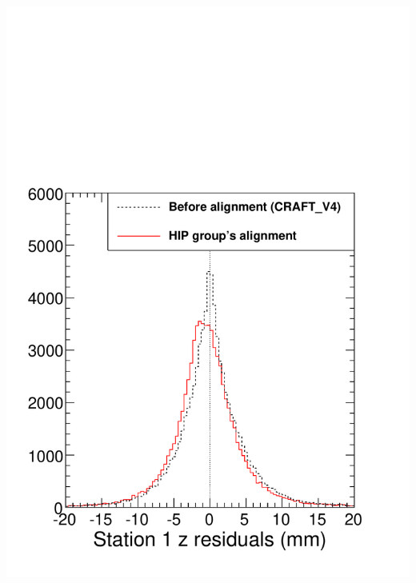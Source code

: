 \documentclass[compress]{beamer}
\begin{document}
\begin{frame}
\begin{columns}
\includegraphics[width=\linewidth]{rawz_station1.pdf}


\end{columns}
\end{frame}
\end{document}
